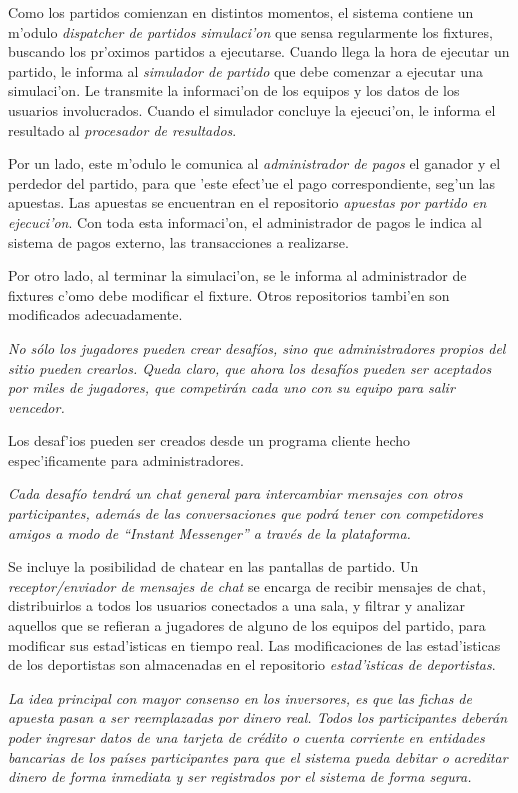 Como los partidos comienzan en distintos momentos, el sistema contiene un m'odulo \textit{dispatcher de partidos simulaci'on} que sensa regularmente los fixtures, buscando los pr'oximos partidos a ejecutarse. Cuando llega la hora de ejecutar un partido, le informa al \textit{simulador de partido} que debe comenzar a ejecutar una simulaci'on. Le transmite la informaci'on de los equipos y los datos de los usuarios involucrados. Cuando el simulador concluye la ejecuci'on, le informa el resultado al \textit{procesador de resultados}.

Por un lado, este m'odulo le comunica al \textit{administrador de pagos} el ganador y el perdedor del partido, para que 'este efect'ue el pago correspondiente, seg'un las apuestas. Las apuestas se encuentran en el repositorio \textit{apuestas por partido en ejecuci'on}. Con toda esta informaci'on, el administrador de pagos le indica al sistema de pagos externo, las transacciones a realizarse.

Por otro lado, al terminar la simulaci'on, se le informa al administrador de fixtures c'omo debe modificar el fixture. Otros repositorios tambi'en son modificados adecuadamente.

\textit{No sólo los jugadores pueden crear desafíos, sino que administradores propios del sitio pueden crearlos. Queda claro, que ahora los desafíos pueden ser aceptados por miles de jugadores, que competirán cada uno con su equipo para salir vencedor.}

Los desaf'ios pueden ser creados desde un programa cliente hecho espec'ificamente para administradores.

\textit{
Cada desafío tendrá un chat general para intercambiar mensajes con otros participantes, además de las conversaciones que podrá tener con competidores amigos a modo de ``Instant Messenger'' a través de la plataforma.
}

Se incluye la posibilidad de chatear en las pantallas de partido. Un \textit{receptor/enviador de mensajes de chat} se encarga de recibir mensajes de chat, distribuirlos a todos los usuarios conectados a una sala, y filtrar y analizar aquellos que se refieran a jugadores de alguno de los equipos del partido, para modificar sus estad'isticas en tiempo real. Las modificaciones de las estad'isticas de los deportistas son almacenadas en el repositorio \textit{estad'isticas de deportistas}.

\textit{
La idea principal con mayor consenso en los inversores, es que las fichas de apuesta pasan a ser reemplazadas por dinero real. Todos los participantes deberán poder ingresar datos de una tarjeta de crédito o cuenta corriente en entidades bancarias de los países participantes para que el sistema pueda debitar o acreditar dinero de forma inmediata y ser registrados por el sistema de forma segura.
}

